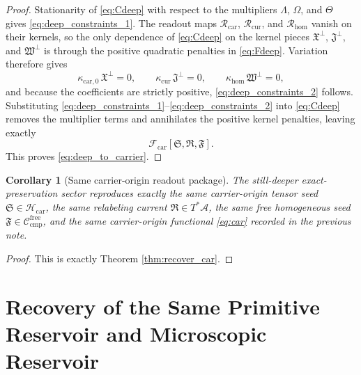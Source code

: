 \documentclass[11pt]{article}
\newcommand{\Sub}{\mathcal A}
\newcommand{\CompFree}{\mathscr C_{\mathrm{cmp}}^{\mathrm{free}}}
\newcommand{\CarrierFunctional}{\mathscr F_{\mathrm{car}}}
\newcommand{\CarrierClass}{\mathscr H_{\mathrm{car}}}
\newcommand{\CarrierSeed}{\mathfrak S}
\newcommand{\RelabelSeed}{\mathfrak R}
\newcommand{\FreeSeed}{\mathfrak F}
\newcommand{\PreCarGap}{\kappa_{\mathrm{car},0}}
\newcommand{\CurrentGap}{\kappa_{\mathrm{cur}}}
\newcommand{\HomGap}{\kappa_{\mathrm{hom}}}
\newcommand{\StrainMult}{\Lambda}
\newcommand{\NeutralMult}{\Omega}
\newcommand{\FreeMult}{\Theta}
\newcommand{\DeepTensor}{\mathfrak X}
\newcommand{\DeepRelabel}{\mathfrak J}
\newcommand{\DeepFree}{\mathfrak W}
\newcommand{\CarRead}{\mathcal R_{\mathrm{car}}}
\newcommand{\CurRead}{\mathcal R_{\mathrm{cur}}}
\newcommand{\HomRead}{\mathcal R_{\mathrm{hom}}}
\newtheorem{corollary}{Corollary}
\begin{document}
\begin{proof}
Stationarity of \eqref{eq:Cdeep} with respect to the multipliers \(\StrainMult\), \(\NeutralMult\), and \(\FreeMult\) gives \eqref{eq:deep_constraints_1}. The readout maps \(\CarRead\), \(\CurRead\), and \(\HomRead\) vanish on their kernels, so the only dependence of \eqref{eq:Cdeep} on the kernel pieces \(\DeepTensor^{\perp}\), \(\DeepRelabel^{\perp}\), and \(\DeepFree^{\perp}\) is through the positive quadratic penalties in \eqref{eq:Fdeep}. Variation therefore gives
\[
\PreCarGap\,\DeepTensor^{\perp}=0,
\qquad
\CurrentGap\,\DeepRelabel^{\perp}=0,
\qquad
\HomGap\,\DeepFree^{\perp}=0,
\]
and because the coefficients are strictly positive, \eqref{eq:deep_constraints_2} follows. Substituting \eqref{eq:deep_constraints_1}--\eqref{eq:deep_constraints_2} into \eqref{eq:Cdeep} removes the multiplier terms and annihilates the positive kernel penalties, leaving exactly
\[
\CarrierFunctional[\CarrierSeed,\RelabelSeed,\FreeSeed].
\]
This proves \eqref{eq:deep_to_carrier}.
\end{proof}

\begin{corollary}[Same carrier-origin readout package]
\label{cor:same_car_package}
The still-deeper exact-preservation sector reproduces exactly the same carrier-origin tensor seed \(\CarrierSeed\in\CarrierClass\), the same relabeling current \(\RelabelSeed\in T^*\Sub\), the same free homogeneous seed \(\FreeSeed\in\CompFree\), and the same carrier-origin functional \eqref{eq:car} recorded in the previous note.
\end{corollary}

\begin{proof}
This is exactly Theorem \ref{thm:recover_car}.
\end{proof}

\section{Recovery of the Same Primitive Reservoir and Microscopic Reservoir}
\end{document}
